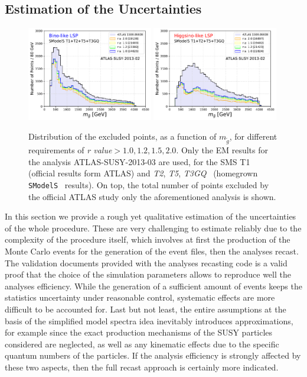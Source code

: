 \documentclass[a4paper,11pt]{article}
\newcommand{\SMO}{\texttt{SModelS\xspace}}
\newcommand{\MGLU}{$ m _{ \tilde g } $\xspace}
\newcommand{\RVALUE}{\textit{r value}}
\newcommand{\TGQ}{ \textit{T3GQ}}
\newcommand{\Ttwo}{ \textit{T2}}
\newcommand{\Tfive}{ \textit{T5}}
\begin{document}
\subsection{Estimation of the Uncertainties}\label{estimation}
\begin{figure}[!h]
	\begin{center}
		\subfigure
		{\includegraphics[width=0.49\textwidth]{PLOTS/Combination/Bino_TOT_GLU_Histo_rValue.pdf}}
		\subfigure
		{\includegraphics[width=0.49\textwidth]{PLOTS/Combination/Higgsino_TOT_GLU_Histo_rValue.pdf}}
	\end{center}
	\caption{Distribution of the excluded points, as a function of \MGLU, for different requirements of \RVALUE$>1.0,1.2,1.5,2.0$. Only the EM results for the analysis ATLAS-SUSY-2013-03 are used, for the SMS T1 (official results form ATLAS) and \Ttwo,\Tfive,\TGQ~ (homegrown \SMO~ results). On top, the total number of points excluded by the official ATLAS study only the aforementioned analysis is shown. } 
	\label{unc}
\end{figure}
In this section we provide a rough yet qualitative estimation of the uncertainties of the whole procedure. These are very challenging to estimate reliably due to the complexity of the procedure itself, which involves at first the production of the Monte Carlo events for the generation of the event files, then the analyses recast. The validation documents provided with the analyses recasting code is a valid proof that the choice of the simulation parameters allows to reproduce well the analyses efficiency. While the generation of a sufficient amount of events keeps the statistics uncertainty under reasonable control, systematic effects are more difficult to be accounted for. Last but not least, the entire assumptions at the basis of the simplified model spectra idea inevitably introduces approximations, for example since the exact production mechanisms of the SUSY particles considered are neglected, as well as any kinematic effects due to the specific quantum numbers of the particles. If the analysis efficiency is strongly affected by these two aspects, then the full recast approach is certainly more indicated.
\end{document}
